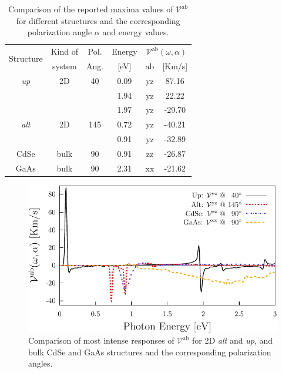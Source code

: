\documentclass[prb,11pt,tightenlines,twocolumn,aps]{revtex4-1}
\begin{document}
\begin{table}[b]
\begin{tabular}{cccccc}
\hline
\multirow{2}{*}{Structure \quad} & 
Kind of \quad & 
Pol. &
Energy & 
\multicolumn{2}{c}{$\mathcal{V}^{\mathrm{ab}}(\omega,\alpha)$}\\
\cline{5-6}
& system & Ang. & [eV] & $\mathrm{ab}$ \quad & [Km/s]\\
\hline
\emph{up}    & 2D   & 40    & 0.09  & $\mathrm{yz}$ &  87.16    \\
             &      &       & 1.94  & $\mathrm{yz}$ &  22.22    \\
             &      &       & 1.97  & $\mathrm{yz}$ & -29.70    \\
\emph{alt}   & 2D   & 145   & 0.72  & $\mathrm{yz}$ & -40.21    \\
             &      &       & 0.91  & $\mathrm{yz}$ & -32.89    \\
 CdSe        & bulk & 90    & 0.91  & $\mathrm{zz}$ & -26.87    \\
 GaAs        & bulk & 90    & 2.31  & $\mathrm{xx}$ & -21.62    \\
\hline
\end{tabular}

\caption{Comparison of the reported maxima values of
$\mathcal{V}^{\mathrm{ab}}$ for different structures and the corresponding
polarization angle $\alpha$ and energy values.}
\label{tab:vab-str-comp}
\end{table}

\begin{figure}[t]
    \centering
    \includegraphics[width=\linewidth]{plots/vab-str-comp}
    
    \caption{Comparison of most intense responses of
    $\mathcal{V}^{\mathrm{ab}}$ for 2D \emph{alt} and \emph{up}, and bulk CdSe
    and GaAs structures and the corresponding polarization angles.}
    \label{fig:vab-str-comp}
\end{figure}
\end{document}
